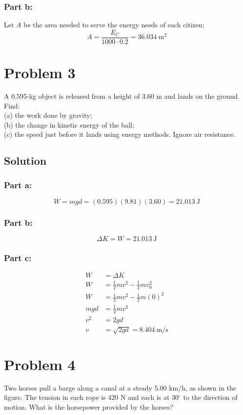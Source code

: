 \documentclass{article}
\begin{document}
\subsubsection*{Part b:}
Let $A$ be the area needed to serve the energy needs of each citizen;
\[
	A = \frac{E_C}{1000 \cdot 0.2} = \boxed{36.034\ \text{m}^2}
\]


\section*{Problem 3}
A 0.595-kg object is released from a height of 3.60 m and lands on the ground. Find: \\
(a) the work done by gravity; \\
(b) the change in kinetic energy of the ball; \\
(c) the speed just before it lands using energy methods. Ignore air resistance.

\subsection*{Solution}
\subsubsection*{Part a:}
\[
	W = mgd = (0.595)(9.81)(3.60) = \boxed{21.013\ \text{J}}
\]

\subsubsection*{Part b:}
\[
	\Delta K = W = \boxed{21.013\ \text{J}}
\]

\subsubsection*{Part c:}
\begin{align*}
	W &= \Delta K \\
	W &= \frac{1}{2}mv^2 - \frac{1}{2}mv_0^2 \\
	W &= \frac{1}{2}mv^2 - \frac{1}{2}m(0)^2 \\
	mgd &= \frac{1}{2}mv^2 \\
	v^2 &= 2gd \\
	v &= \sqrt{2gd} = \boxed{8.404\ \text{m}/\text{s}}
\end{align*}



\section*{Problem 4}
Two horses pull a barge along a canal at a steady 5.00 km/h, as shown in the figure. The tension in each rope
is 420 N and each is at 30$^\circ$ to the direction of motion. What is the horsepower provided by the horses?
\end{document}
